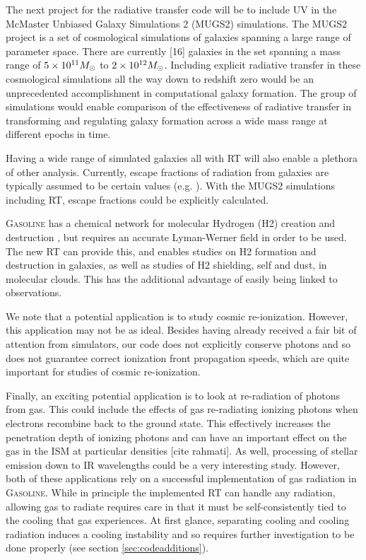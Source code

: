 The next project for the radiative transfer code will be to include UV in the McMaster Unbiased Galaxy Simulations 2 (MUGS2) simulations. The MUGS2 project is a set of cosmological simulations of galaxies spanning a large range of parameter space. There are currently [16] galaxies in the set spanning a mass range of $5\times 10^{11} M_{\odot}$ to $2\times 10^{12} M_{\odot}$. Including explicit radiative transfer in these cosmological simulations all the way down to redshift zero would be an unprecedented accomplishment in computational galaxy formation. The group of simulations would enable comparison of the effectiveness of radiative transfer in transforming and regulating galaxy formation across a wide mass range at different epochs in time.

Having a wide range of simulated galaxies all with RT will also enable a plethora of other analysis. Currently, escape fractions of radiation from galaxies are typically assumed to be certain values (e.g. \citet{kannanEt14}). With the MUGS2 simulations including RT, escape fractions could be explicitly calculated.

\textsc{Gasoline} has a chemical network for molecular Hydrogen (H2) creation and destruction \citep{christensenEt12}, but requires an accurate Lyman-Werner field in order to be used. The new RT can provide this, and enables studies on H2 formation and destruction in galaxies, as well as studies of H2 shielding, self and dust, in molecular clouds. This has the additional advantage of easily being linked to observations.

We note that a potential application is to study cosmic re-ionization. However, this application may not be as ideal. Besides having already received a fair bit of attention from simulators, our code does not explicitly conserve photons and so does not guarantee correct ionization front propagation speeds, which are quite important for studies of cosmic re-ionization.

Finally, an exciting potential application is to look at re-radiation of photons from gas. This could include the effects of gas re-radiating ionizing photons when electrons recombine back to the ground state. This effectively increases the penetration depth of ionizing photons and can have an important effect on the gas in the ISM at particular densities [cite rahmati]. As well, processing of stellar emission down to IR wavelengths could be a very interesting study. However, both of these applications rely on a successful implementation of gas radiation in \textsc{Gasoline}. While in principle the implemented RT can handle any radiation, allowing gas to radiate requires care in that it must be self-consistently tied to the cooling that gas experiences. At first glance, separating cooling and cooling radiation induces a cooling instability and so requires further investigation to be done properly (see section \ref{sec:codeadditions}).

